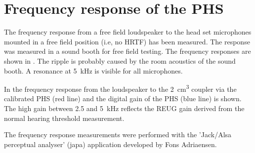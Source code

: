 \documentclass[11pt,a4paper,twoside]{article}
\begin{document}
\section{Frequency response of the PHS}

The frequency response from a free field loudspeaker to the head set
microphones mounted in a free field position (i.e, no HRTF) has been
measured.
%
The response was measured in a sound booth for free field testing.
%
The frequency responses are shown in .
%
The ripple is probably caused by the room acoustics of the sound booth.
%
A resonance at 5~kHz is visible for all microphones.

In  the frequency response from
the loudspeaker to the 2~cm\textsuperscript{3} coupler via the
calibrated PHS (red line) and the digital gain of the PHS (blue line)
is shown.
%
The high gain between 2.5 and 5~kHz reflects the REUG gain derived
from the normal hearing threshold measurement.

The frequency response measurements were performed with the 'Jack/Alsa
perceptual analyser' (japa) application developed by Fons Adriaensen.


\end{document}
